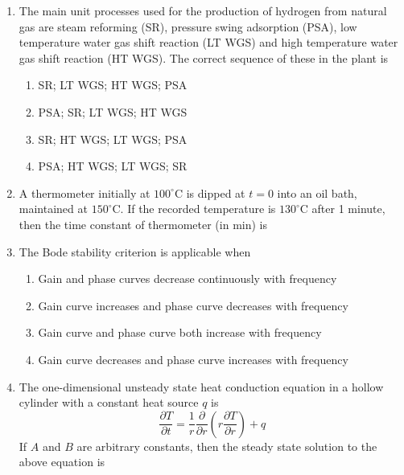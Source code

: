 \documentclass[journal,12pt,onecolumn]{IEEEtran}
\theoremstyle{remark}
\begin{document}
\begin{enumerate}
\item The main unit processes used for the production of hydrogen from natural gas are steam reforming (SR), pressure swing adsorption (PSA), low temperature water gas shift reaction (LT WGS) and high temperature water gas shift reaction (HT WGS). The correct sequence of these in the plant is
\hfill{}
\begin{enumerate}
    \item SR; LT WGS; HT WGS; PSA
    \item PSA; SR; LT WGS; HT WGS
    \item SR; HT WGS; LT WGS; PSA
    \item PSA; HT WGS; LT WGS; SR
\end{enumerate}
\item A thermometer initially at $100^\circ$C is dipped at $t = 0$ into an oil bath, maintained at $150^\circ$C. If the recorded temperature is $130^\circ$C after 1 minute, then the time constant of thermometer (in min) is
\hfill{}
\begin{enumerate}
\end{enumerate}

\item The Bode stability criterion is applicable when
\hfill{}
\begin{enumerate}
    \item Gain and phase curves decrease continuously with frequency
    \item Gain curve increases and phase curve decreases with frequency
    \item Gain curve and phase curve both increase with frequency
    \item Gain curve decreases and phase curve increases with frequency
\end{enumerate}

\item The one-dimensional unsteady state heat conduction equation in a hollow cylinder with a constant heat source $q$ is
\[\frac{\partial T}{\partial t} = \frac{1}{r} \frac{\partial}{\partial r} \left( r \frac{\partial T}{\partial r} \right) + q\]
If $A$ and $B$ are arbitrary constants, then the steady state solution to the above equation is
\hfill{}
\begin{enumerate}
\end{enumerate}


\end{enumerate}
\end{document}
